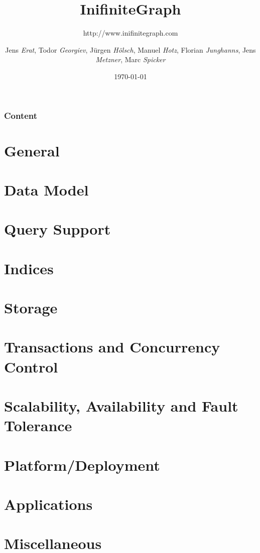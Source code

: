 \documentclass{beamer}
\title[InifiniteGraph]{\textsf{InifiniteGraph}}
\subtitle{http://www.inifinitegraph.com}
\author[JE,TG,JH,MH,FJ,JM,MS]{Jens \textit{Erat},
Todor \textit{Georgiev},
J\"{u}rgen \textit{H\"{o}lsch},
Manuel \textit{Hotz},
Florian \textit{Junghanns},
Jens \textit{Metzner},
Marc \textit{Spicker}}
\institute[]{Universität Konstanz}
\date{\today}
\begin{document}

\begin{frame}
\titlepage
\end{frame}


\begin{frame}
\frametitle{Content}
\tableofcontents
\end{frame}


\section{General}


\section{Data Model}


\section{Query Support}


\section{Indices}


\section{Storage}


\section{Transactions and Concurrency Control}


\section{Scalability, Availability and Fault Tolerance}


\section{Platform/Deployment}


\section{Applications}


\section{Miscellaneous}

\end{document}
